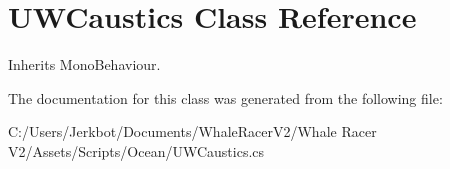 \hypertarget{class_u_w_caustics}{}\section{U\+W\+Caustics Class Reference}
\label{class_u_w_caustics}


Inherits Mono\+Behaviour.



The documentation for this class was generated from the following file\+:\begin{DoxyCompactItemize}
\item 
C\+:/\+Users/\+Jerkbot/\+Documents/\+Whale\+Racer\+V2/\+Whale Racer V2/\+Assets/\+Scripts/\+Ocean/U\+W\+Caustics.\+cs\end{DoxyCompactItemize}
